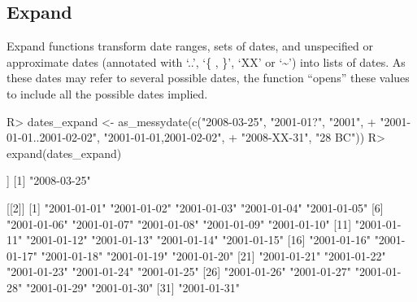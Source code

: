 \documentclass[
]{jss}
\begin{document}
\hypertarget{expand}{%
\subsection{Expand}\label{expand}}

Expand functions transform date ranges, sets of dates, and unspecified
or approximate dates (annotated with `..', `\{ , \}', `XX' or
`\textasciitilde{}') into lists of dates. As these dates may refer to
several possible dates, the function ``opens'' these values to include
all the possible dates implied.

\begin{CodeChunk}
\begin{CodeInput}
R> dates_expand <- as_messydate(c("2008-03-25", "2001-01?", "2001",
+                                "2001-01-01..2001-02-02", "{2001-01-01,2001-02-02}",
+                                "2008-XX-31", "28 BC"))
R> expand(dates_expand)
\end{CodeInput}
\begin{CodeOutput}
[[1]]
[1] "2008-03-25"

[[2]]
 [1] "2001-01-01" "2001-01-02" "2001-01-03" "2001-01-04" "2001-01-05"
 [6] "2001-01-06" "2001-01-07" "2001-01-08" "2001-01-09" "2001-01-10"
[11] "2001-01-11" "2001-01-12" "2001-01-13" "2001-01-14" "2001-01-15"
[16] "2001-01-16" "2001-01-17" "2001-01-18" "2001-01-19" "2001-01-20"
[21] "2001-01-21" "2001-01-22" "2001-01-23" "2001-01-24" "2001-01-25"
[26] "2001-01-26" "2001-01-27" "2001-01-28" "2001-01-29" "2001-01-30"
[31] "2001-01-31"


\end{CodeOutput}
\end{CodeChunk}
\end{document}

